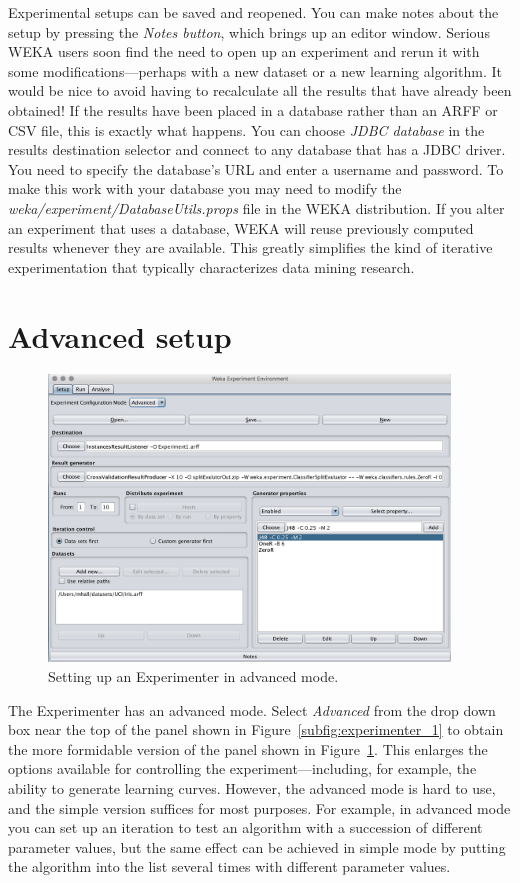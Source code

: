 Experimental setups can be saved and reopened. You can make notes
about the setup by pressing the \textit{Notes button}, which brings up
an editor window. Serious WEKA users soon find the need to open up an
experiment and rerun it with some modifications---perhaps with a new
dataset or a new learning algorithm. It would be nice to avoid having
to recalculate all the results that have already been obtained! If the
results have been placed in a database rather than an ARFF or CSV
file, this is exactly what happens. You can choose \textit{JDBC
  database} in the results destination selector and connect to any
database that has a JDBC driver. You need to specify the database's
URL and enter a username and password. To make this work with your
database you may need to modify the
\textit{weka/experiment/DatabaseUtils.props} file in the WEKA
distribution. If you alter an experiment that uses a database, WEKA
will reuse previously computed results whenever they are
available. This greatly simplifies the kind of iterative
experimentation that typically characterizes data mining research.

\section{Advanced setup}

\begin{figure}[!th]
\centering
\includegraphics[width=0.95\textwidth]{images/B4_3.png}
\caption{Setting up an Experimenter in advanced mode.}
\label{fig:experimenter_advanced}
\end{figure}


The Experimenter has an advanced mode. Select \textit{Advanced} from
the drop down box near the top of the panel shown in
Figure~\ref{subfig:experimenter_1} to obtain the more formidable
version of the panel shown in
Figure~\ref{fig:experimenter_advanced}. This enlarges the options
available for controlling the experiment---including, for example, the
ability to generate learning curves. However, the advanced mode is
hard to use, and the simple version suffices for most purposes. For
example, in advanced mode you can set up an iteration to test an
algorithm with a succession of different parameter values, but the
same effect can be achieved in simple mode by putting the algorithm
into the list several times with different parameter values.

